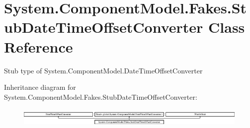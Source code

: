 \hypertarget{class_system_1_1_component_model_1_1_fakes_1_1_stub_date_time_offset_converter}{\section{System.\-Component\-Model.\-Fakes.\-Stub\-Date\-Time\-Offset\-Converter Class Reference}
\label{class_system_1_1_component_model_1_1_fakes_1_1_stub_date_time_offset_converter}
}


Stub type of System.\-Component\-Model.\-Date\-Time\-Offset\-Converter 


Inheritance diagram for System.\-Component\-Model.\-Fakes.\-Stub\-Date\-Time\-Offset\-Converter\-:\begin{figure}[H]
\begin{center}
\leavevmode
\includegraphics[height=0.935673cm]{class_system_1_1_component_model_1_1_fakes_1_1_stub_date_time_offset_converter}
\end{center}
\end{figure}
